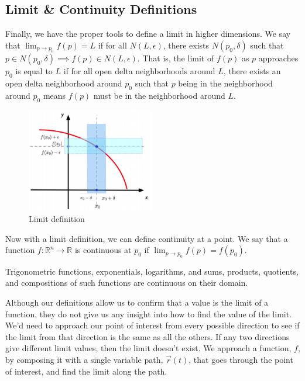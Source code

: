 \subsection{Limit \& Continuity Definitions}
\noindent
Finally, we have the proper tools to define a limit in higher dimensions.
We say that $\lim_{p\to p_0}{f(p)} = L$ if for all $N(L, \epsilon)$, there exists $N(p_0,\delta)$ such that $p \in N(p_0, \delta) \implies f(p) \in N(L, \epsilon)$.
That is, the limit of $f(p)$ as $p$ approaches $p_0$ is equal to $L$ if for all open delta neighborhoods around $L$, there exists an open delta neighborhood around $p_0$ such that $p$ being in the neighborhood around $p_0$ means $f(p)$ must be in the neighborhood around $L$.

\begin{figure}[H]
	\centering
	\includegraphics[width=0.5\textwidth]{./differentialMultivariableCalculus/limit.png}
	\caption{Limit definition}
\end{figure}

\noindent
Now with a limit definition, we can define continuity at a point.
We say that a function $f : \mathbb{R}^n \to \mathbb{R}$ is continuous at $p_0$ if $\lim_{p \to p_0}{f(p)} = f(p_0)$.\\

\noindent
\begin{theorem}
	Trigonometric functions, exponentials, logarithms, and sums, products, quotients, and compositions of such functions are continuous on their domain.
\end{theorem}

\noindent
Although our definitions allow us to confirm that a value is the limit of a function, they do not give us any insight into how to find the value of the limit.
We'd need to approach our point of interest from every possible direction to see if the limit from that direction is the same as all the others.
If any two directions give different limit values, then the limit doesn't exist.
We approach a function, $f$, by composing it with a single variable path, $\vec{r}(t)$, that goes through the point of interest, and find the limit along the path.\\

